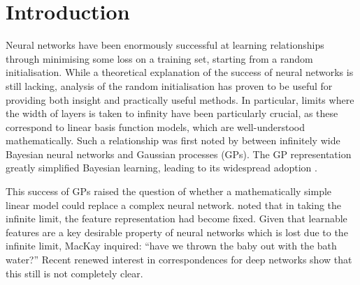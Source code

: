 \documentclass{article}
\theoremstyle{definition}
\newcommand{\markcomment}[1]{\todo[color=green]{#1}\xspace}
\newcommand{\adriacomment}[1]{\todo[color=blue]{#1}\xspace}
\begin{document}
\section{Introduction}
Neural networks have been enormously successful at learning relationships through minimising some loss on a training set, starting from a random initialisation. While a theoretical explanation of the success of neural networks is still lacking, analysis of the random initialisation has proven to be useful for providing both insight %
and practically useful methods.
In particular, limits where the width of layers is taken to infinity have been particularly crucial, as these correspond to linear basis function models, which are well-understood mathematically.
Such a relationship was first noted by \citet{neal1996bayesian} between infinitely wide Bayesian neural networks and Gaussian processes (GPs). The GP representation greatly simplified Bayesian learning, leading to its widespread adoption \citep{williams1996gpr,gpml}.

This success of GPs raised the question of whether a mathematically simple linear model could replace a complex neural network. \citet{mackay1998introgp} noted that in taking the infinite limit, the feature representation had become fixed. Given that learnable features are a key desirable property of neural networks which is lost due to the infinite limit, MacKay inquired: ``have we thrown the baby out with the bath water?'' Recent renewed interest in correspondences for deep networks \citep{matthews2018dnnlimit,lee2018dnnlimit} show that this still is not completely clear.
\end{document}

